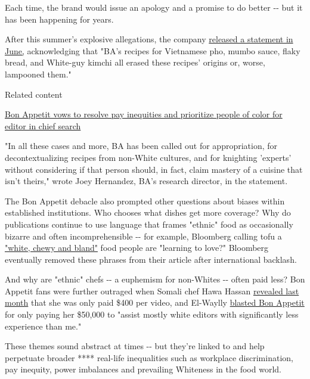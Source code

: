 Each time, the brand would issue an apology and a promise to do better
-\/- but it has been happening for years.

After this summer's explosive allegations, the company
\href{https://www.bonappetit.com/story/recipe-audit?utm_brand=ba\&mbid=social_twitter\&utm_social-type=owned\&utm_source=twitter\&utm_medium=social}{released
a statement in June,} acknowledging that "BA's recipes for Vietnamese
pho, mumbo sauce, flaky bread, and White-guy kimchi all erased these
recipes' origins or, worse, lampooned them."

Related content

\href{/2020/06/10/media/bon-appetit-apologizes/index.html}{Bon Appetit
vows to resolve pay inequities and prioritize people of color for editor
in chief search}

"In all these cases and more, BA has been called out for appropriation,
for decontextualizing recipes from non-White cultures, and for knighting
'experts' without considering if that person should, in fact, claim
mastery of a cuisine that isn't theirs," wrote Joey Hernandez, BA's
research director, in the statement.

The Bon Appetit debacle also prompted other questions about biases
within established institutions. Who chooses what dishes get more
coverage? Why do publications continue to use language that frames
"ethnic" food as occasionally bizarre and often incomprehensible -\/-
for example, Bloomberg calling tofu a
\href{https://www.bloomberg.com/news/articles/2020-06-11/the-pandemic-opens-the-door-to-tofu-makers-who-race-to-meet-deman?sref=783qcuCY}{"white,
chewy and bland"} food people are "learning to love?" Bloomberg
eventually removed these phrases from their article after international
backlash.

And why are "ethnic" chefs -\/- a euphemism for non-Whites -\/- often
paid less? Bon Appetit fans were further outraged when Somali chef Hawa
Hassan \href{https://i.imgur.com/QUCsdbx.png}{revealed last month} that
she was only paid \$400 per video, and El-Waylly
\href{https://twitter.com/sarahmanavis/status/1270069650060083207?ref_src=twsrc\%5Etfw\%7Ctwcamp\%5Etweetembed\%7Ctwterm\%5E1270069650060083207\%7Ctwgr\%5E\&ref_url=https\%3A\%2F\%2Fwww.insider.com\%2Fbon-appetit-sohla-el-waylly-people-rallying-behind-adam-rapoport-2020-6}{blasted
Bon Appetit} for only paying her \$50,000 to "assist mostly white
editors with significantly less experience than me."

These themes sound abstract at times -\/- but they're linked to and help
perpetuate broader **** real-life inequalities such as workplace
discrimination, pay inequity, power imbalances and prevailing Whiteness
in the food world.

